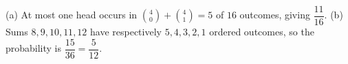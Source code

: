 (a) At most one head occurs in $\binom40+\binom41=5$ of $16$ outcomes, giving $\boxed{\dfrac{11}{16}}$.
(b) Sums $8,9,10,11,12$ have respectively $5,4,3,2,1$ ordered outcomes, so the probability is $\boxed{\dfrac{15}{36}=\dfrac{5}{12}}$.
